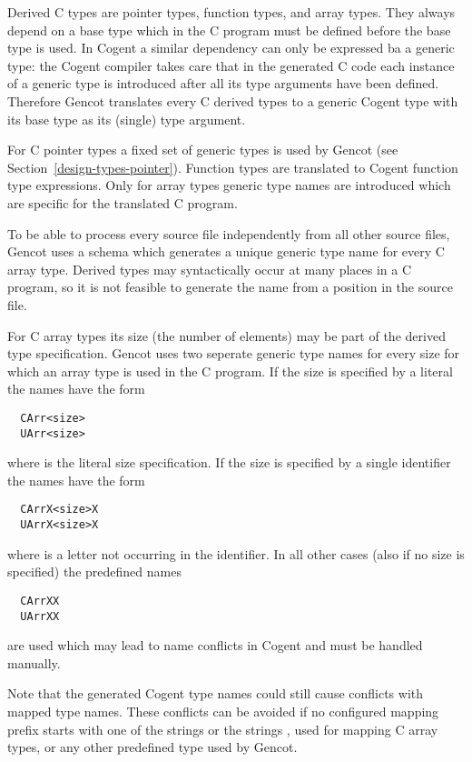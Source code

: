 Derived C types are pointer types, function types, and array types. They always depend on a base type which in the C program 
must be defined before the base type is used.
In Cogent a similar dependency can only be expressed ba a generic type: the Cogent compiler takes care that in the generated C code
each instance
of a generic type is introduced after all its type arguments have been defined. Therefore Gencot translates every C derived
types to a generic Cogent type with its base type as its (single) type argument. 

For C pointer types a fixed set of generic types is used by Gencot (see Section~\ref{design-types-pointer}). Function types 
are translated to Cogent function type expressions. Only for array types generic type names are introduced which are specific
for the translated C program.

To be able to process every source file independently from all other source files, Gencot uses a schema which generates
a unique generic type name for every C array type. Derived types may syntactically occur at many places in a C program, so
it is not feasible to generate the name from a position in the source file.

For C array types its size (the number of elements) may be part of the derived type specification. Gencot uses two seperate generic
type names for every size for which an array type is used in the C program. If the size is specified by a literal the names
have the form
\begin{verbatim}
  CArr<size>
  UArr<size>
\end{verbatim}
where  is the literal size specification. If the size is specified by a single identifier the names have the form
\begin{verbatim}
  CArrX<size>X
  UArrX<size>X
\end{verbatim}
where  is a letter not occurring in the identifier.
In all other cases (also if no size is specified) the predefined names
\begin{verbatim}
  CArrXX
  UArrXX
\end{verbatim}
are used which may lead to name conflicts in Cogent and must be handled manually. 

Note that the generated Cogent type names could still cause conflicts with mapped type names. These conflicts can be
avoided if no configured mapping prefix starts with one of the  strings
or the strings ,  used for mapping C array types, or any other predefined type used by Gencot.

